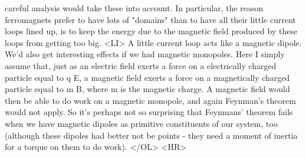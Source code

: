 careful analysis would take these into account.  In particular,
the reason ferromagnets prefer to have lots of "domains" than to have
all their little current loops lined up, is to keep the energy
due to the magnetic field produced by these loops from getting too big.
<LI>
A little current loop acts like a magnetic dipole.  We'd
also get interesting effects if we had magnetic monopoles. 
Here I simply assume that, just as an electric field exerts a force on
a electrically charged particle equal to q E, a magnetic field
exerts a force on a magnetically charged particle equal to m B,
where m is the magnetic charge.  A magnetic field would then
be able to do work on a magnetic monopole, and again Feynman's
theorem would not apply.  So it's perhaps not so surprising that
Feynmans' theorem fails when we have magnetic dipoles as primitive
constituents of our system, too (although these dipoles had better
not be points - they need a moment of inertia for a torque on
them to do work).  
</OL>
<HR>



